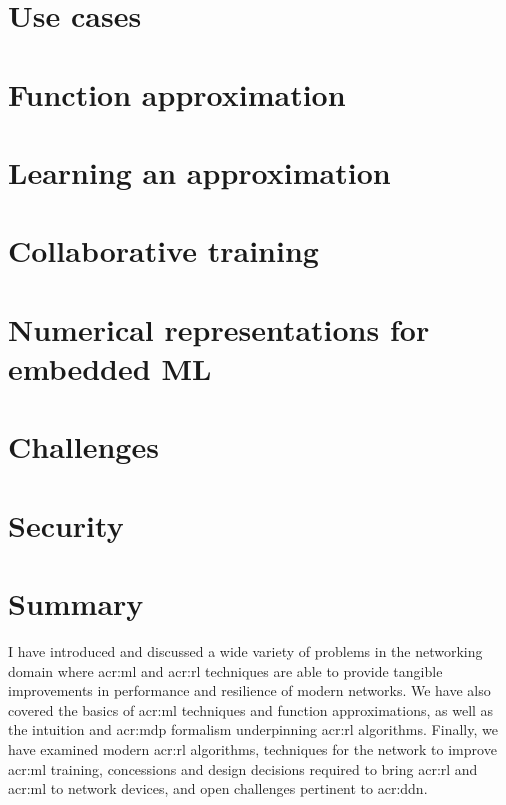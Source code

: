 \section{Use cases}\label{sec:use-cases}%


\section{Function approximation}\label{sec:function-approximation}


\section{Learning an approximation}\label{sec:learning-an-approximation}%


\section{Collaborative training}\label{sec:ddn-collaborative-training}


\section{Numerical representations for embedded ML}\label{sec:numerical-representations-for-embedded-ml}


\section{Challenges}\label{sec:ddn-challenges}


\section{Security}\label{sec:ddn-security}


\section{Summary}
I have introduced and discussed a wide variety of problems in the networking domain where \gls{acr:ml} and \gls{acr:rl} techniques are able to provide tangible improvements in performance and resilience of modern networks.
We have also covered the basics of \gls{acr:ml} techniques and function approximations, as well as the intuition and \gls{acr:mdp} formalism underpinning \gls{acr:rl} algorithms.
Finally, we have examined modern \gls{acr:rl} algorithms, techniques for the network to improve \gls{acr:ml} training, concessions and design decisions required to bring \gls{acr:rl} and \gls{acr:ml} to network devices, and open challenges pertinent to \gls{acr:ddn}.

